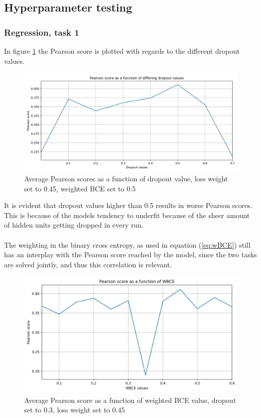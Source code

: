 \subsection{Hyperparameter testing}
\subsubsection{Regression, task 1}
In figure \ref{fig:averagedropout} the Pearson score is plotted with regards to the different dropout values.
\begin{figure}[H]
    \centering
        \includegraphics[width=\textwidth]{pictures/DropoutPlot.png}
        \caption{Average Pearson scores as a function of dropout value, loss weight set to 0.45, weighted BCE set to 0.5}
        \label{fig:averagedropout}
\end{figure}
It is evident that dropout values higher than 0.5 results in worse Pearson scores. This is because of the models tendency to underfit because of the sheer amount of hidden units getting dropped in every run.\\
\\
The weighting in the binary cross entropy, as used in equation (\ref{eq:wBCE}) still has an interplay with the Pearson score reached by the model, since the two tasks are solved jointly, and thus this correlation is relevant.
\begin{figure}[H]
    \centering
        \includegraphics[width=\textwidth]{pictures/weightedBCEplot.png}
        \caption{Average Pearson score as a function of weighted BCE value, dropout set to 0.3, loss weight set to 0.45}
        \label{fig:averageBCE}
\end{figure}
